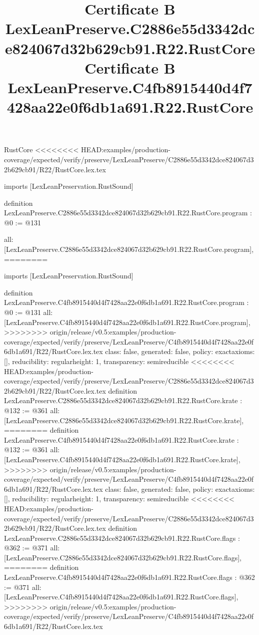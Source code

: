 \begin{lexlean}{RustCore}
<<<<<<<< HEAD:examples/production-coverage/expected/verify/preserve/LexLeanPreserve/C2886e55d3342dce824067d32b629cb91/R22/RustCore.lex.tex
\title{Certificate B LexLeanPreserve.C2886e55d3342dce824067d32b629cb91.R22.RustCore}
\begin{coremodule}
imports [LexLeanPreservation.RustSound]

definition LexLeanPreserve.C2886e55d3342dce824067d32b629cb91.R22.RustCore.program : @0 := @131 {
  all: [LexLeanPreserve.C2886e55d3342dce824067d32b629cb91.R22.RustCore.program],
========
\title{Certificate B LexLeanPreserve.C4fb8915440d4f7428aa22e0f6db1a691.R22.RustCore}
\begin{coremodule}
imports [LexLeanPreservation.RustSound]

definition LexLeanPreserve.C4fb8915440d4f7428aa22e0f6db1a691.R22.RustCore.program : @0 := @131 {
  all: [LexLeanPreserve.C4fb8915440d4f7428aa22e0f6db1a691.R22.RustCore.program],
>>>>>>>> origin/release/v0.5:examples/production-coverage/expected/verify/preserve/LexLeanPreserve/C4fb8915440d4f7428aa22e0f6db1a691/R22/RustCore.lex.tex
  class: false,
  generated: false,
  policy: exact{axioms: []},
  reducibility: regular{height: 1},
  transparency: semireducible
}
<<<<<<<< HEAD:examples/production-coverage/expected/verify/preserve/LexLeanPreserve/C2886e55d3342dce824067d32b629cb91/R22/RustCore.lex.tex
definition LexLeanPreserve.C2886e55d3342dce824067d32b629cb91.R22.RustCore.krate : @132 := @361 {
  all: [LexLeanPreserve.C2886e55d3342dce824067d32b629cb91.R22.RustCore.krate],
========
definition LexLeanPreserve.C4fb8915440d4f7428aa22e0f6db1a691.R22.RustCore.krate : @132 := @361 {
  all: [LexLeanPreserve.C4fb8915440d4f7428aa22e0f6db1a691.R22.RustCore.krate],
>>>>>>>> origin/release/v0.5:examples/production-coverage/expected/verify/preserve/LexLeanPreserve/C4fb8915440d4f7428aa22e0f6db1a691/R22/RustCore.lex.tex
  class: false,
  generated: false,
  policy: exact{axioms: []},
  reducibility: regular{height: 1},
  transparency: semireducible
}
<<<<<<<< HEAD:examples/production-coverage/expected/verify/preserve/LexLeanPreserve/C2886e55d3342dce824067d32b629cb91/R22/RustCore.lex.tex
definition LexLeanPreserve.C2886e55d3342dce824067d32b629cb91.R22.RustCore.flags : @362 := @371 {
  all: [LexLeanPreserve.C2886e55d3342dce824067d32b629cb91.R22.RustCore.flags],
========
definition LexLeanPreserve.C4fb8915440d4f7428aa22e0f6db1a691.R22.RustCore.flags : @362 := @371 {
  all: [LexLeanPreserve.C4fb8915440d4f7428aa22e0f6db1a691.R22.RustCore.flags],
>>>>>>>> origin/release/v0.5:examples/production-coverage/expected/verify/preserve/LexLeanPreserve/C4fb8915440d4f7428aa22e0f6db1a691/R22/RustCore.lex.tex
}}}
\end{coremodule}}
\end{coremodule}
\end{lexlean}
